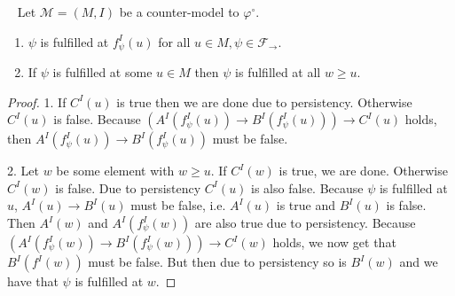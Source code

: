 \documentclass[a4paper,UKenglish,cleveref, autoref, thm-restate]{lipics-v2021}
\begin{document}
\begin{lemma}~\label{thm:prop-countermodel-reduction2}
	Let $\mathcal M = (M, I)$ be a counter-model to $\mathcal \varphi^\circ$.
	\begin{enumerate}
		\item $\psi$ is fulfilled at $f_\psi^I(u)$ for all $u\in M, \psi\in\mathcal F_\to$.
		\item If $\psi$ is fulfilled at some $u\in M$ then $\psi$ is fulfilled at all $w\geq u$.
	\end{enumerate}
\end{lemma}

\begin{proof}
	1. If $C^I(u)$ is true then we are done due to persistency. Otherwise $C^I(u)$ is false.
	Because $(A^I(f_\psi^I(u))\to B^I(f_\psi^I(u)))\to C^I(u)$ holds, then $A^I(f_\psi^I(u))\to B^I(f_\psi^I(u))$ must be false.
	
	
	2. Let $w$ be some element with $w\geq u$.
	If $C^I(w)$ is true, we are done.
	Otherwise $C^I(w)$ is false.
	Due to persistency $C^I(u)$ is also false.
	Because $\psi$ is fulfilled at $u$, $A^I(u)\to B^I(u)$ must be false, i.e. $A^I(u)$ is true and $B^I(u)$ is false. Then $A^I(w)$ and $A^I(f^I_\psi(w))$ are also true due to persistency.
	Because $(A^I(f^I_\psi(w))\to B^I(f^I_\psi(w)))\to C^I(w)$ holds, we now get that  $B^I(f^I(w))$ must be false.
	But then due to persistency so is $B^I(w)$ and we have that $\psi$ is fulfilled at $w$.
\end{proof}
\end{document}
